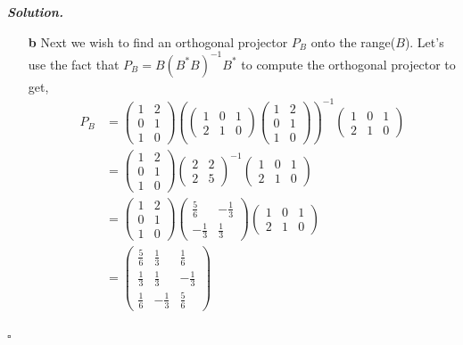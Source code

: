 \documentclass[12pt]{report}
\newenvironment{solution}[1][\it{Solution}]{\textbf{#1. } }{$\square$}
\begin{document}
\begin{solution}
\begin{enumerate}
        \item [{\bf b}] Next we wish to find an orthogonal projector $P_B$ onto the range($B$). Let's use the fact that $P_B = B(B^*B)^{-1}B^*$ to compute the orthogonal projector to get,
        \begin{align*}
            P_B &= \begin{pmatrix}
                1&2\\0&1\\1&0
            \end{pmatrix} \left( \begin{pmatrix}1&0&1\\ 2&1&0\end{pmatrix} \begin{pmatrix}
                1&2\\0&1\\1&0
            \end{pmatrix} \right)^{-1} \begin{pmatrix}1&0&1\\ 2&1&0\end{pmatrix}\\
            &= \begin{pmatrix}
                1&2\\0&1\\1&0
            \end{pmatrix} \begin{pmatrix}2&2\\ 2&5\end{pmatrix}^{-1}\begin{pmatrix}1&0&1\\ 2&1&0\end{pmatrix}\\
            &= \begin{pmatrix}
                1&2\\0&1\\1&0
            \end{pmatrix}\begin{pmatrix}\frac{5}{6}&-\frac{1}{3}\\ -\frac{1}{3}&\frac{1}{3}\end{pmatrix}\begin{pmatrix}1&0&1\\ 2&1&0\end{pmatrix}\\
            &= \begin{pmatrix}\frac{5}{6}&\frac{1}{3}&\frac{1}{6}\\ \frac{1}{3}&\frac{1}{3}&-\frac{1}{3}\\ \frac{1}{6}&-\frac{1}{3}&\frac{5}{6}\end{pmatrix}

\end{align*}
\end{enumerate}
\end{solution}
\end{document}
